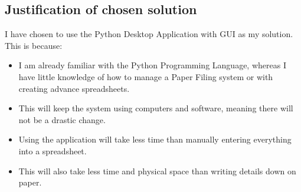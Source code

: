 \subsection{Justification of chosen solution}
I have chosen to use the Python Desktop Application with GUI as my solution. This is because:

\begin{itemize}
    \item I am already familiar with the Python Programming Language, whereas I have little knowledge of how to manage a Paper Filing system or with creating advance spreadsheets.
    \item This will keep the system using computers and software, meaning there will not be a drastic change.
    \item Using the application will take less time than manually entering everything into a spreadsheet.
    \item This will also take less time and physical space than writing details down on paper.
\end{itemize}
